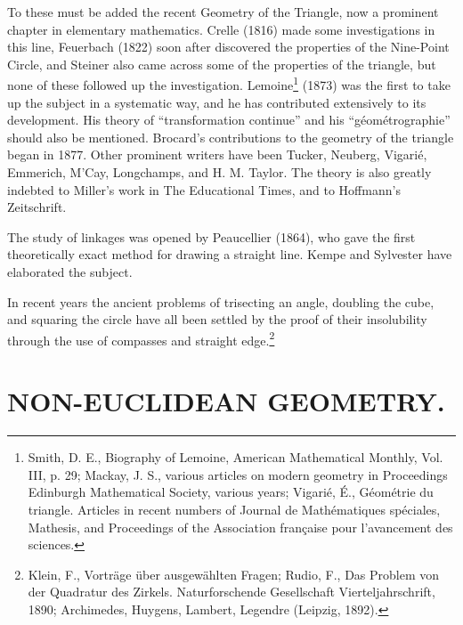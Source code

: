 \documentclass[oneside]{book}
\begin{document}
To these must be added the recent Geometry of the Triangle, now a
prominent chapter in elementary mathematics. Crelle (1816) made
some investigations in this line, Feuerbach (1822) soon after
discovered the properties of the Nine-Point Circle, and Steiner also
came across some of the properties of the triangle, but none of
these followed up the investigation. Lemoine\footnote{Smith,
D. E., Biography of Lemoine, American Mathematical Monthly,
Vol. III, p. 29; Mackay, J. S., various articles on modern geometry
in Proceedings Edinburgh Mathematical Society, various years;
Vigari\'e, \'E., G\'eom\'etrie du triangle. Articles in recent
numbers of Journal de Math\'ematiques sp\'eciales, Mathesis, and
Proceedings of the Association fran\c{c}aise pour l'avancement des
sciences.} (1873) was the first to take up the subject in a
systematic way, and he has contributed extensively to its
development. His theory of ``transformation continue'' and his
``g\'eom\'etrographie'' should also be mentioned. Brocard's
contributions to the geometry of the triangle began in 1877. Other
prominent writers have been Tucker, Neuberg, Vigari\'e, Emmerich,
M'Cay, Longchamps, and H. M. Taylor. The theory is also greatly
indebted to Miller's work in The Educational Times, and to
Hoffmann's Zeitschrift.

The study of linkages was opened by Peaucellier (1864), who gave the
first theoretically exact method for drawing a straight line. Kempe
and Sylvester have elaborated the subject.

In recent years the ancient problems of trisecting an angle,
doubling the cube, and squaring the circle have all been settled by
the proof of their insolubility through the use of compasses and
straight edge.\footnote{Klein, F., Vortr\"age \"uber ausgew\"ahlten
Fragen; Rudio, F., Das Problem von der Quadratur des Zirkels.
Naturforschende Gesellschaft Vierteljahrschrift, 1890; Archimedes,
Huygens, Lambert, Legendre (Leipzig, 1892).}

\chapter{NON-EUCLIDEAN GEOMETRY.}
\end{document}
